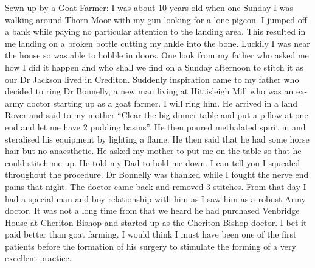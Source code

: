 Sewn up by a Goat Farmer:  I was about 10 years old when one Sunday I was
walking around Thorn Moor with my gun looking for a lone pigeon.  I jumped off
a bank while paying no particular attention to the landing area.  This resulted
in me landing on a broken bottle cutting my ankle into the bone.  Luckily I was
near the house so was able to hobble in doors.  One look from my father who
asked me how I did it happen and who shall we find on a Sunday afternoon to
stitch it as our Dr Jackson lived in Crediton.  Suddenly inspiration came to my
father who decided to ring Dr Bonnelly, a new man living at Hittisleigh Mill
who was an ex-army doctor starting up as a goat farmer.  I will ring him. He
arrived in a land Rover and said to my mother ``Clear the big dinner table and
put a pillow at one end and let me have 2 pudding basins''.  He then poured
methalated spirit in and steralised his equipment by lighting a flame.  He then
said that he had some horse hair but no anaesthetic.  He asked my mother to put
me on the table so that he could stitch me up.  He told my Dad to hold me down.
I can tell you I squealed throughout the procedure.  Dr Bonnelly was thanked
while I fought the nerve end pains that night.  The doctor came back and
removed 3 stitches.  From that day I had a special man and boy relationship
with him as I saw him as a robust Army doctor.  It was not a long time from
that we heard he had purchased Venbridge House at Cheriton Bishop and started
up as the Cheriton Bishop doctor.  I bet it paid better than goat farming.  I
would think I must have been one of the first patients before the formation of
his surgery to stimulate the forming of a very excellent practice.
